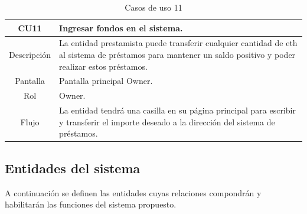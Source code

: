 \begin{table}[H]
\centering
\caption{Casos de uso 11}
\begin{tabular}{|c|p{12cm}|}
    \hline
    \rowcolor[HTML]{D0E7FF}
    CU11 & Ingresar fondos en el sistema. \\ \hline
    Descripción   & La entidad prestamista  puede transferir cualquier cantidad de \gls{eth}
    al sistema de préstamos para mantener
 un saldo positivo y poder realizar estos préstamos.\\ \hline
    Pantalla     & Pantalla principal Owner.   \\ \hline
    Rol     & Owner. \\ \hline
    Flujo     &    La entidad tendrá una casilla en su página principal para escribir y transferir el
importe deseado a la dirección del sistema de préstamos.
                 \\ \hline
\end{tabular}
\end{table}

\clearpage
\subsection{Entidades del sistema}
A continuación se definen las entidades cuyas relaciones compondrán y 
habilitarán las funciones del sistema propuesto.

